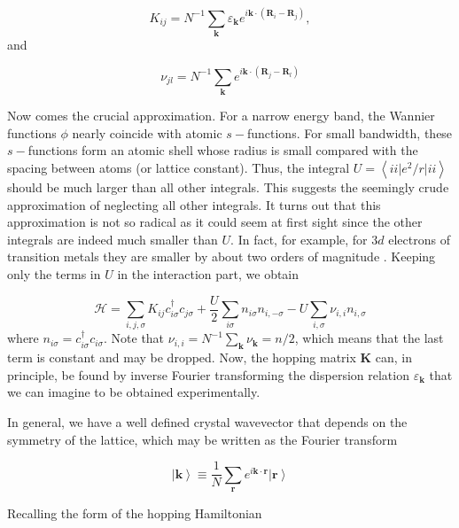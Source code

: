 \begin{equation}\label{eq:hopping_matrix}
K_{ij} = N^{-1} \sum_{\bm k} \varepsilon_{\bm k} e^{i \bm k \cdot ( \bm R_i - \bm R_j )},
\end{equation}
and

\begin{equation}
\nu_{j l} = N^{-1} \sum_{\bm k} e^{i \bm k \cdot ( \bm R_j - \bm R_l) }
\end{equation}

Now comes the crucial approximation. For a narrow energy band, the Wannier functions $\phi$ nearly coincide with atomic $s-$functions. For small bandwidth, these $s-$functions form an atomic shell whose radius is small compared with the spacing between atoms (or lattice constant). Thus, the integral $U = \left\langle i i \big| e^2 / r \big| i i \right\rangle$ should be much larger than all other integrals. This suggests the seemingly crude approximation of neglecting all other integrals. It turns out that this approximation is not so radical as it could seem at first sight since the other integrals are indeed much smaller than $U$. In fact, for example, for $3d$ electrons of transition metals they are smaller by about two orders of magnitude \cite{Hubbard1963}. Keeping only the terms in $U$ in the interaction part, we obtain

\begin{equation}
\mathcal{H} = \sum_{i, j, \sigma} K_{ij} c_{i\sigma}^\dagger c_{j\sigma} + \frac{U}{2} \sum_{i\sigma} n_{i\sigma} n_{i, -\sigma} - U \sum_{i, \sigma} \nu_{i, i} n_{i, \sigma}
\end{equation}
where $n_{i\sigma} = c_{i\sigma}^\dagger c_{i\sigma}$. Note that $\nu_{i, i} = N^{-1} \sum_{\bm k} \nu_{\bm k} = n/2$, which means that the last term is constant and may be dropped. Now, the hopping matrix $\bm K$ can, in principle, be found by inverse Fourier transforming the dispersion relation $\varepsilon_{\bm k}$ that we can imagine to be obtained experimentally.

In general, we have a well defined crystal wavevector that depends on the symmetry of the lattice, which may be written as the Fourier transform

\begin{equation}
\left| \bm k \right\rangle \equiv \frac{1}{N} \sum_{\bm r} e^{i\bm k \cdot \bm r} \left| \bm r \right\rangle
\end{equation}

Recalling the form of the hopping Hamiltonian

